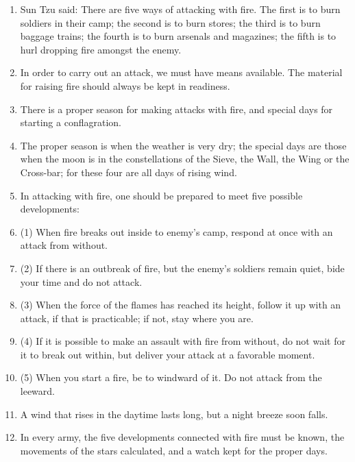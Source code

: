 \begin{enumerate}
  
\item Sun Tzu said:  There are five ways of attacking
    with fire.  The first is to burn soldiers in their camp;
    the second is to burn stores; the third is to burn
    baggage trains; the fourth is to burn arsenals and magazines;
    the fifth is to hurl dropping fire amongst the enemy.

  \item In order to carry out an attack, we must have means available.
    The material for raising fire should always be kept in readiness.

  \item There is a proper season for making attacks with fire, and
    special days for starting a conflagration.

  \item The proper season is when the weather is very dry; the special
    days are those when the moon is in the constellations of the
    Sieve, the Wall, the Wing or the Cross-bar; for these four are all
    days of rising wind.

  \item In attacking with fire, one should be prepared to meet five
    possible developments:

  \item (1) When fire breaks out inside to enemy's camp, respond at
    once with an attack from without.

  \item (2) If there is an outbreak of fire, but the enemy's soldiers
    remain quiet, bide your time and do not attack.

  \item (3) When the force of the flames has reached its height,
    follow it up with an attack, if that is practicable; if not, stay
    where you are.

  \item (4) If it is possible to make an assault with fire from
    without, do not wait for it to break out within, but deliver your
    attack at a favorable moment.

  \item (5) When you start a fire, be to windward of it. Do not attack
    from the leeward.

  \item A wind that rises in the daytime lasts long, but a night
    breeze soon falls.

  \item In every army, the five developments connected with fire must
    be known, the movements of the stars calculated, and a watch kept
    for the proper days.


\end{enumerate}
